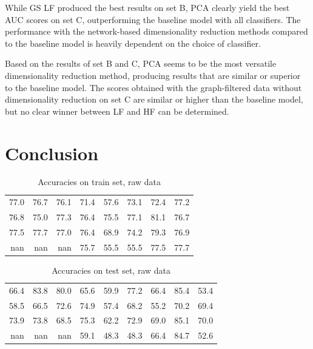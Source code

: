 \documentclass[10pt,conference,compsocconf]{IEEEtran}
\newcommand{\beginsupplement}{%
	\setcounter{table}{0}
	\renewcommand{\thetable}{S\arabic{table}}%
	\setcounter{figure}{0}
	\renewcommand{\thefigure}{S\arabic{figure}}%
}
\begin{document}
While GS LF produced the best results on set B, PCA clearly yield the best AUC scores on set C, outperforming the baseline model with all classifiers. The performance with the network-based dimensionality reduction methods compared to the baseline model is heavily dependent on the choice of classifier. 

Based on the results of set B and C, PCA seems to be the most versatile dimensionality reduction method, producing results that are similar or superior to the baseline model. The scores obtained with the graph-filtered data without dimensionality reduction on set C are similar or higher than the baseline model, but no clear winner between LF and HF can be determined. 

\section*{Conclusion}







\beginsupplement

\begin{table}[H]
	\centering
	\begin{tabular}{rrrrrrrr}
		\hline
		77.0 &  76.7 &  76.1 & 71.4 & 57.6 & 73.1 & 72.4 & 77.2 \\
		76.8 &  75.0 &  77.3 & 76.4 & 75.5 & 77.1 & 81.1 & 76.7 \\
		77.5 &  77.7 &  77.0 & 76.4 & 68.9 & 74.2 & 79.3 & 76.9 \\
		nan   & nan   & nan   & 75.7 & 55.5 & 55.5 & 77.5 & 77.7 \\
		\hline
	\end{tabular}
	\caption{Accuracies on train set, raw data}
\end{table}

\begin{table}[H]
	\centering
	\begin{tabular}{rrrrrrrrr}
		\hline
		66.4 &  83.8 &  80.0 & 65.6 & 59.9 & 77.2 & 66.4 & 85.4 & 53.4 \\
		58.5 &  66.5 &  72.6 & 74.9 & 57.4 & 68.2 & 55.2 & 70.2 & 69.4 \\
		73.9 &  73.8 &  68.5 & 75.3 & 62.2 & 72.9 & 69.0 & 85.1 & 70.0 \\
		nan   & nan   & nan   & 59.1 & 48.3 & 48.3 & 66.4 & 84.7 & 52.6 \\
		\hline
	\end{tabular}
	\caption{Accuracies on test set, raw data}
\end{table}
	
\end{document}
